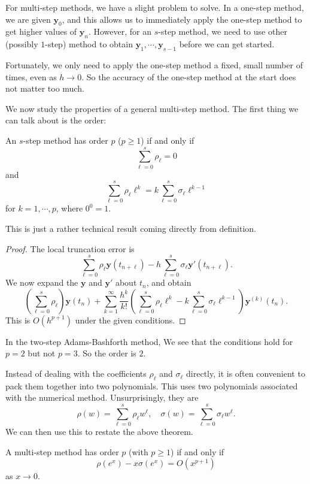 \documentclass[a4paper]{article}
\begin{document}
For multi-step methods, we have a slight problem to solve. In a one-step method, we are given $\mathbf{y}_0$, and this allows us to immediately apply the one-step method to get higher values of $\mathbf{y}_n$. However, for an $s$-step method, we need to use other (possibly $1$-step) method to obtain $\mathbf{y}_1, \cdots, \mathbf{y}_{s - 1}$ before we can get started.

Fortunately, we only need to apply the one-step method a fixed, small number of times, even as $h \to 0$. So the accuracy of the one-step method at the start does not matter too much.

We now study the properties of a general multi-step method. The first thing we can talk about is the order:
\begin{thm}
  An $s$-step method has order $p$ ($p \geq 1$) if and only if
  \[
    \sum_{\ell = 0}^s \rho_\ell = 0
  \]
  and
  \[
    \sum_{\ell = 0}^s \rho_\ell \ell^k = k\sum_{\ell = 0}^s \sigma_\ell \ell^{k - 1}
  \]
  for $k = 1, \cdots, p$, where $0^0 = 1$.
\end{thm}

This is just a rather technical result coming directly from definition.
\begin{proof}
  The local truncation error is
  \[
    \sum_{\ell = 0}^s \rho_\ell \mathbf{y}(t_{n + \ell}) - h \sum_{\ell = 0}^s \sigma_\ell \mathbf{y}'(t_{n + \ell}).
  \]
  We now expand the $\mathbf{y}$ and $\mathbf{y}'$ about $t_n$, and obtain
  \[
    \left(\sum_{\ell = 0}^s \rho_\ell\right) \mathbf{y}(t_n) + \sum_{k = 1}^\infty \frac{h^k}{k!}\left(\sum_{\ell = 0}^s \rho_\ell \ell^k - k \sum_{\ell = 0}^s \sigma_\ell \ell^{k - 1}\right)\mathbf{y}^{(k)}(t_n).
  \]
  This is $O(h^{p + 1})$ under the given conditions.
\end{proof}

\begin{eg}[AB2]
  In the two-step Adams-Bashforth method, We see that the conditions hold for $p = 2$ but not $p = 3$. So the order is $2$.
\end{eg}

Instead of dealing with the coefficients $\rho_\ell$ and $\sigma_\ell$ directly, it is often convenient to pack them together into two polynomials. This uses two polynomials associated with the numerical method. Unsurprisingly, they are
\[
  \rho(w) = \sum_{\ell = 0}^s \rho_\ell w^\ell,\quad \sigma(w) = \sum_{\ell = 0}^s \sigma_\ell w^\ell.
\]
We can then use this to restate the above theorem.
\begin{thm}
  A multi-step method has order $p$ (with $p \geq 1$) if and only if
  \[
    \rho(e^x) - x \sigma(e^x) = O(x^{p + 1})
  \]
  as $x \to 0$.
\end{thm}
\end{document}
